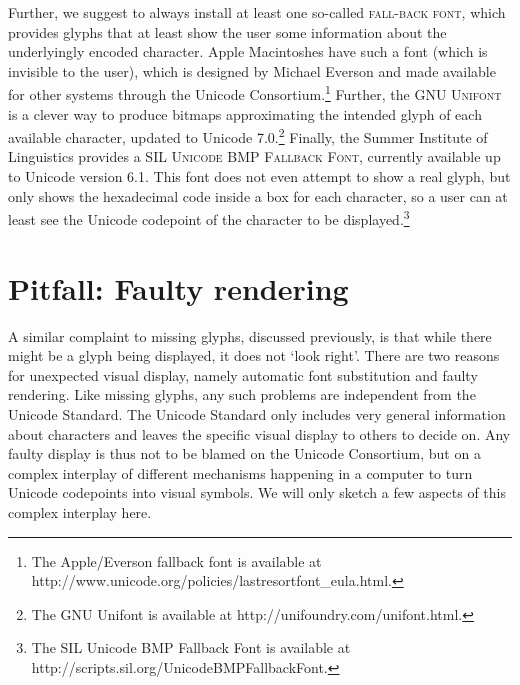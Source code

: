 Further, we suggest to always install at least one so-called \textsc{fall-back font,} which provides glyphs that at least show the user some information about the underlyingly encoded character. Apple Macintoshes have such a font (which is invisible to the user), which is designed by Michael Everson and made available for other systems through the Unicode Consortium.\footnote{The Apple/Everson fallback font is available at http://www.unicode.org/policies/lastresortfont\_eula.html.} Further, the \textsc{GNU Unifont} is a clever way to produce bitmaps approximating the intended glyph of each available character, updated to Unicode 7.0.\footnote{The GNU Unifont is available at http://unifoundry.com/unifont.html.} Finally, the Summer Institute of Linguistics provides a \textsc{SIL Unicode BMP Fallback Font}, currently available up to Unicode version 6.1. This font does not even attempt to show a real glyph, but only shows the hexadecimal code inside a box for each character, so a user can at least see the Unicode codepoint of the character to be displayed.\footnote{The SIL Unicode BMP Fallback Font is available at http://scripts.sil.org/UnicodeBMPFallbackFont.}

\section{Pitfall: Faulty rendering}
\label{pitfall-faulty-rendering}

A similar complaint to missing glyphs, discussed previously, is that while there might be a glyph being displayed, it does not `look right'. There are two reasons for unexpected visual display, namely automatic font substitution and faulty rendering. Like missing glyphs, any such problems are independent from the Unicode Standard. The Unicode Standard only includes very general information about characters and leaves the specific visual display to others to decide on. Any faulty display is thus not to be blamed on the Unicode Consortium, but on a complex interplay of different mechanisms happening in a computer to turn Unicode codepoints into visual symbols. We will only sketch a few aspects of this complex interplay here.

